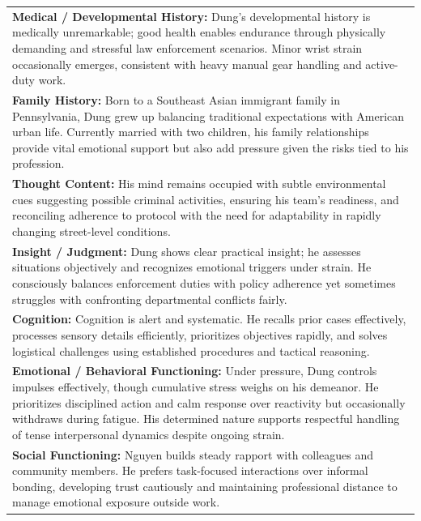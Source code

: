 \documentclass[11pt]{article}
\begin{document}
\begin{table}[ht]
\begin{tabularx}{\textwidth}{@{}X@{}}
\textbf{Medical / Developmental History:} Dung's developmental history is medically unremarkable; good health enables endurance through physically demanding and stressful law enforcement scenarios. Minor wrist strain occasionally emerges, consistent with heavy manual gear handling and active-duty work. \\[4pt]

\textbf{Family History:} Born to a Southeast Asian immigrant family in Pennsylvania, Dung grew up balancing traditional expectations with American urban life. Currently married with two children, his family relationships provide vital emotional support but also add pressure given the risks tied to his profession. \\[4pt]

\textbf{Thought Content:} His mind remains occupied with subtle environmental cues suggesting possible criminal activities, ensuring his team’s readiness, and reconciling adherence to protocol with the need for adaptability in rapidly changing street-level conditions. \\[4pt]

\textbf{Insight / Judgment:} Dung shows clear practical insight; he assesses situations objectively and recognizes emotional triggers under strain. He consciously balances enforcement duties with policy adherence yet sometimes struggles with confronting departmental conflicts fairly. \\[4pt]

\textbf{Cognition:} Cognition is alert and systematic. He recalls prior cases effectively, processes sensory details efficiently, prioritizes objectives rapidly, and solves logistical challenges using established procedures and tactical reasoning. \\[4pt]

\textbf{Emotional / Behavioral Functioning:} Under pressure, Dung controls impulses effectively, though cumulative stress weighs on his demeanor. He prioritizes disciplined action and calm response over reactivity but occasionally withdraws during fatigue. His determined nature supports respectful handling of tense interpersonal dynamics despite ongoing strain. \\[4pt]

\textbf{Social Functioning:} Nguyen builds steady rapport with colleagues and community members. He prefers task-focused interactions over informal bonding, developing trust cautiously and maintaining professional distance to manage emotional exposure outside work. \\[4pt]


\end{tabularx}
\end{table}
\end{document}
